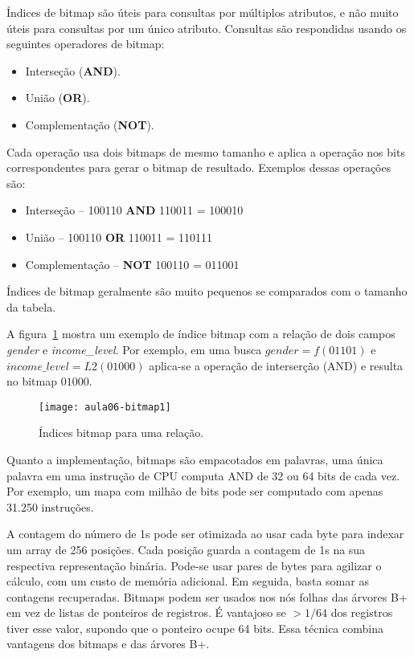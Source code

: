 Índices de bitmap são úteis para consultas por múltiplos atributos, e não muito úteis
para consultas por um único atributo.
Consultas são respondidas usando os seguintes operadores de bitmap:
\begin{itemize}
\item Interseção (\textbf{AND}).
\item União (\textbf{OR}).
\item Complementação (\textbf{NOT}).
\end{itemize}
Cada operação usa dois bitmaps de mesmo tamanho e aplica a operação nos bits
correspondentes para gerar o bitmap de resultado. Exemplos dessas operações são:
\begin{itemize}
\item Interseção -- 100110 \textbf{AND} 110011 = 100010
\item União --      100110 \textbf{OR} 110011 = 110111
\item Complementação -- \textbf{NOT} 100110 = 011001
\end{itemize}
Índices de bitmap geralmente são muito pequenos se comparados com o tamanho da tabela.

A figura~\ref{aula06:fig:bitmap1} mostra um exemplo de índice bitmap com a relação
de dois campos \emph{gender} e \emph{income\_level}. 
Por exemplo, em uma busca $gender = f(01101)$ e $income\_level = L2(01000)$ aplica-se a 
operação de interserção (AND) e resulta no bitmap $01000$.
%
\begin{figure}[!htb]
\centering
\texttt{[image: aula06-bitmap1]}
\caption{Índices bitmap para uma relação.}
\label{aula06:fig:bitmap1}
\end{figure}

Quanto a implementação, bitmaps são empacotados em palavras, uma única palavra 
em uma instrução de CPU computa AND de 32 ou 64 bits de cada vez.
Por exemplo, um mapa com milhão de bits pode ser computado com apenas
31.250 instruções.

A contagem do número de 1s pode ser otimizada ao usar cada byte para indexar
um array de 256 posições.
Cada posição guarda a contagem de 1s na sua respectiva representação binária. 
Pode-se usar pares de bytes para agilizar o cálculo, com um custo
de memória adicional.
Em seguida, basta somar as contagens recuperadas.
Bitmaps podem ser usados nos nós folhas das árvores B+ em vez de listas 
de ponteiros de registros.
É vantajoso se $> 1/64$ dos registros tiver esse valor, supondo que o ponteiro
ocupe 64 bits.
Essa técnica combina vantagens dos bitmaps e das árvores B+.

